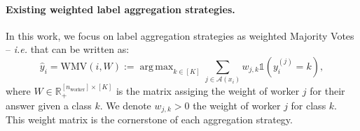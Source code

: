 \documentclass{cap2024}
\DeclareMathOperator*{\argmax}{arg\,max}
\begin{document}
\paragraph{Existing weighted label aggregation strategies.}

In this work, we focus on label aggregation strategies as weighted Majority Votes \citep{littlestone1994weighted} -- \emph{i.e.} that can be written as:
\begin{equation}
  \label{eq:wmv_general}
  \hat{y}_i = \text{WMV}(i, W):=\argmax_{k \in [K]} \sum_{j\in\mathcal{A}(x_i)} w_{j,k} \mathds{1}(y_i^{(j)} = k),
\end{equation}
where $W \in \mathbb{R}_+^{[n_\text{worker}]\times [K]}$ is the matrix assiging the weight of worker $j$ for their answer given a class $k$.
We denote $w_{j,k}>0$ the weight of worker $j$ for class $k$.
This weight matrix is the cornerstone of each aggregation strategy.
\end{document}
